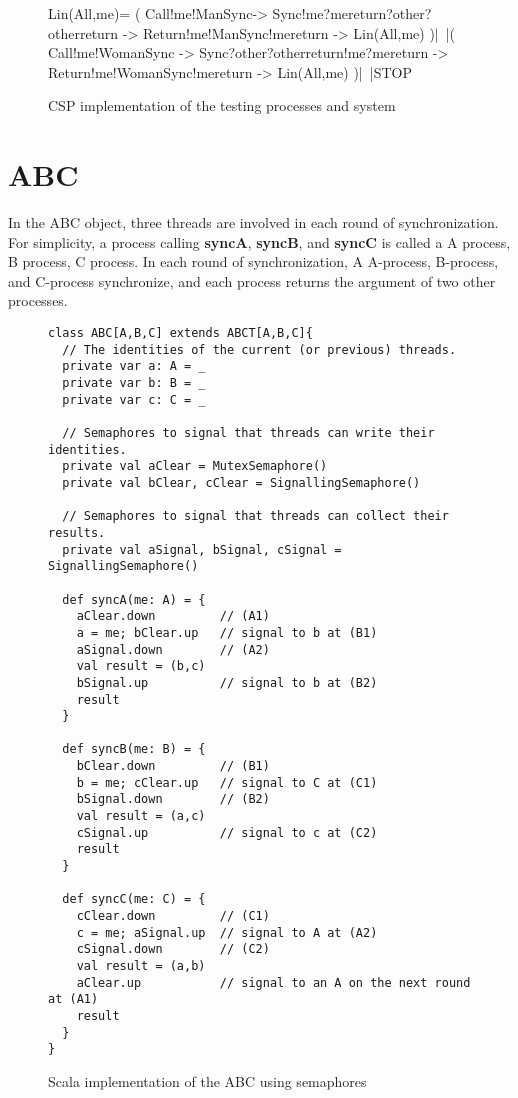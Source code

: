 \documentclass{article}
\begin{document}
\begin{figure}[hbtp]
\begin{cspm}
Lin(All,me)= (
  Call!me!ManSync->
  Sync!me?mereturn?other?otherreturn ->
  Return!me!ManSync!mereturn ->
  Lin(All,me)
)|~|(
  Call!me!WomanSync ->
  Sync?other?otherreturn!me?mereturn ->
  Return!me!WomanSync!mereturn ->
  Lin(All,me)
)|~|STOP
\end{cspm}
\caption{CSP implementation of the testing processes and system}
\label{menwomen.csp.testsystem}
\end{figure}

\section{ABC}
In the ABC object, three threads are involved in each round of synchronization. For simplicity, a process calling \textbf{syncA}, \textbf{syncB}, and \textbf{syncC} is called a A process, B process, C process. In each round of synchronization, A A-process, B-process, and C-process synchronize, and each process returns the argument of two other processes. 

\begin{figure}
\begin{verbatim}
class ABC[A,B,C] extends ABCT[A,B,C]{
  // The identities of the current (or previous) threads.
  private var a: A = _
  private var b: B = _
  private var c: C = _

  // Semaphores to signal that threads can write their identities.
  private val aClear = MutexSemaphore()
  private val bClear, cClear = SignallingSemaphore()

  // Semaphores to signal that threads can collect their results. 
  private val aSignal, bSignal, cSignal = SignallingSemaphore()

  def syncA(me: A) = {
    aClear.down         // (A1)
    a = me; bClear.up   // signal to b at (B1)
    aSignal.down        // (A2)
    val result = (b,c)
    bSignal.up          // signal to b at (B2)
    result
  }

  def syncB(me: B) = {
    bClear.down         // (B1)
    b = me; cClear.up   // signal to C at (C1)
    bSignal.down        // (B2)
    val result = (a,c)
    cSignal.up          // signal to c at (C2)
    result
  }

  def syncC(me: C) = {
    cClear.down         // (C1)
    c = me; aSignal.up  // signal to A at (A2)
    cSignal.down        // (C2)
    val result = (a,b)
    aClear.up           // signal to an A on the next round at (A1)
    result
  }
}      
\end{verbatim}
\caption{Scala implementation of the ABC using semaphores}
\label{abc.scala.correct}
\end{figure}
\end{document}
